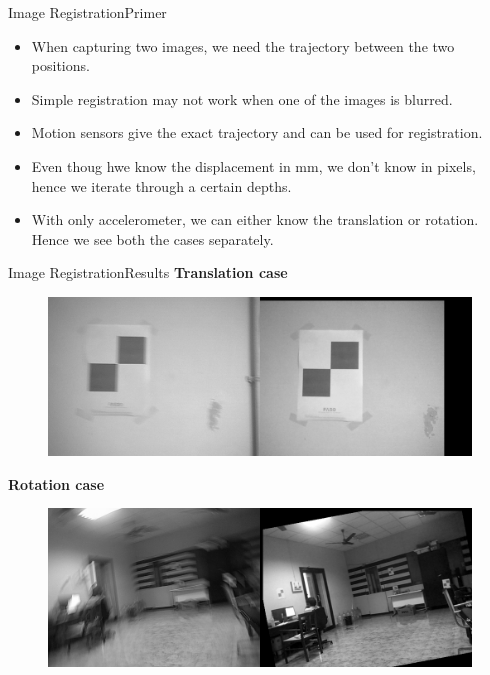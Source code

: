 \documentclass{beamer}
\begin{document}
\begin{frame}{Image Registration}{Primer}
\begin{itemize}
	\item When capturing two images, we need the trajectory between the
	two positions.
	\item Simple registration may not work when one of the images is blurred.
	\item Motion sensors give the exact trajectory and can be used for registration.
	\item Even thoug hwe know the displacement in mm, we don't know in pixels, hence
	we iterate through a certain depths.
	\item With only accelerometer, we can either know the translation or rotation. Hence we see both the cases separately.
\end{itemize}
\end{frame}

\begin{frame}{Image Registration}{Results}
\textbf{Translation case}
\begin{figure}[H]
\begin{center}
	\resizebox{70mm}{!} {\includegraphics {../images/imreg/shift/eg1/imreg.png}}
\end{center}
\end{figure}
\textbf{Rotation case}
\begin{figure}[H]
\begin{center}
	\resizebox{70mm}{!} {\includegraphics {../images/imreg/rotation/eg2/imreg.png}}
\end{center}
\end{figure}
\end{frame}
\end{document}
